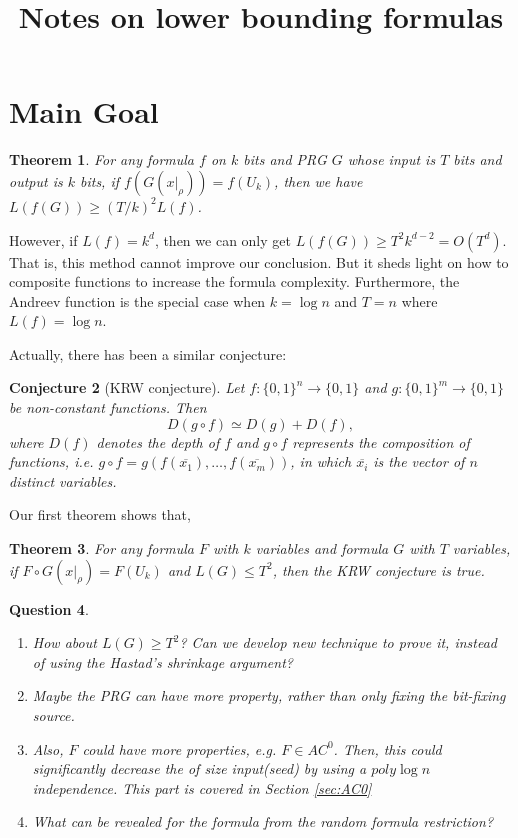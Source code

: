 \documentclass[12pt]{article}
\title{Notes on lower bounding formulas}
\newtheorem{theorem}{Theorem}[section]
\newtheorem{q}[theorem]{Question}
\newtheorem{conjecture}[theorem]{Conjecture}
\renewcommand{\.}{,\ldots,}
\begin{document}
		\maketitle 

\section{Main Goal}
\begin{theorem}
	For any formula $f$ on $k$ bits and PRG $G$ whose input is $T$ bits and output is $k$ bits, if $f( G(x|_\rho))=f(U_k)$, then we have 
	$L(f (G))\geq (T/k)^2 L(f)$.
\end{theorem}
However, if $L(f)=k^d$, then we can only get $L(f(G))\geq T^2k^{d-2}=O(T^d) $. That is, this method cannot improve our conclusion. But it sheds light on how to composite functions to increase the formula complexity.   Furthermore, the Andreev function is the special case when $k=\log n$ and $T=n$ where $L(f)=\log n$. 


Actually, there has been a similar conjecture: 
\begin{conjecture}[KRW conjecture]
Let $f : \{0, 1\}^n\rightarrow \{0, 1\}$ and $g : \{0, 1\}^m \rightarrow \{0, 1\}$ be non-constant functions. Then
$$D(g \circ f) \simeq D(g) + D(f),$$
where $D(f)$ denotes the depth of $f$ and $g\circ f$ represents the composition of functions, i.e. $g\circ f=g(f(\overline{x_1}),\ldots, f(\overline{x_m}))$, in which $\overline{x_i}$ is the vector of $n$ distinct variables. 
\end{conjecture}

Our first theorem shows that, 
\begin{theorem}
	For any formula $F$ with $k$ variables and  formula $G$ with $T$ variables, if $F\circ G(x|_\rho)=F(U_k)$ and $L(G)\leq T^2$, then the KRW conjecture is true.
\end{theorem}
\begin{q}
	\begin{enumerate}
		\item How about $L(G)\ge T^2$?  Can we develop new technique to prove it, instead of using the Hastad's shrinkage argument?
		\item Maybe the PRG  can have more property, rather than only fixing the bit-fixing source.
		\item Also, $F$ could have more properties, e.g. $F\in AC^0$. Then,  this could significantly decrease the of size input(seed) by using a $poly\log n$ independence. This part is covered in Section \ref{sec:AC0} 
		\item What can be revealed for the formula from the random formula restriction?
		\end{enumerate}
		\end{q}
\end{document}
